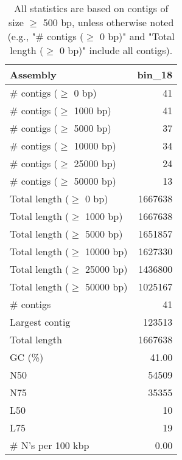 \documentclass[12pt,a4paper]{article}
\begin{document}
\begin{table}[ht]
\begin{center}
\caption{All statistics are based on contigs of size $\geq$ 500 bp, unless otherwise noted (e.g., "\# contigs ($\geq$ 0 bp)" and "Total length ($\geq$ 0 bp)" include all contigs).}
\begin{tabular}{|l*{1}{|r}|}
\hline
Assembly & bin\_18 \\ \hline
\# contigs ($\geq$ 0 bp) & 41 \\ \hline
\# contigs ($\geq$ 1000 bp) & 41 \\ \hline
\# contigs ($\geq$ 5000 bp) & 37 \\ \hline
\# contigs ($\geq$ 10000 bp) & 34 \\ \hline
\# contigs ($\geq$ 25000 bp) & 24 \\ \hline
\# contigs ($\geq$ 50000 bp) & 13 \\ \hline
Total length ($\geq$ 0 bp) & 1667638 \\ \hline
Total length ($\geq$ 1000 bp) & 1667638 \\ \hline
Total length ($\geq$ 5000 bp) & 1651857 \\ \hline
Total length ($\geq$ 10000 bp) & 1627330 \\ \hline
Total length ($\geq$ 25000 bp) & 1436800 \\ \hline
Total length ($\geq$ 50000 bp) & 1025167 \\ \hline
\# contigs & 41 \\ \hline
Largest contig & 123513 \\ \hline
Total length & 1667638 \\ \hline
GC (\%) & 41.00 \\ \hline
N50 & 54509 \\ \hline
N75 & 35355 \\ \hline
L50 & 10 \\ \hline
L75 & 19 \\ \hline
\# N's per 100 kbp & 0.00 \\ \hline
\end{tabular}
\end{center}
\end{table}
\end{document}
